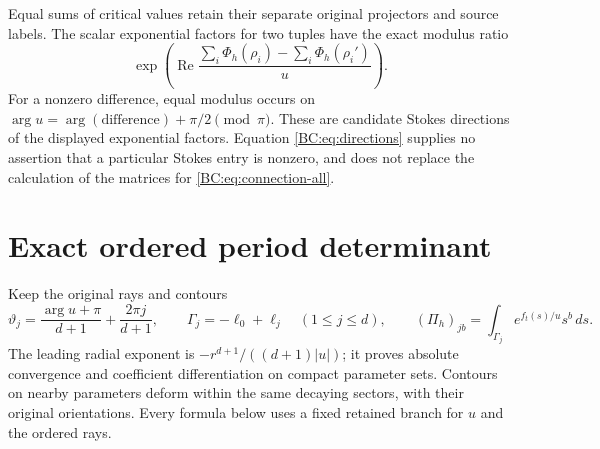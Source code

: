 \documentclass[11pt,a4paper]{article}
\begin{document}
Equal sums of critical values retain their separate original projectors
and source labels.  The scalar exponential factors for two tuples have
the exact modulus ratio
\begin{equation}
 \exp\!\left(\operatorname{Re}
      \frac{\sum_i\Phi_h(\rho_i)-\sum_i\Phi_h(\rho_i')}{u}\right).
 \label{BC:eq:directions}
\end{equation}
For a nonzero difference, equal modulus occurs on
$\arg u=\arg(\text{difference})+\pi/2\pmod\pi$.
These are candidate Stokes directions of the displayed exponential
factors.  Equation \eqref{BC:eq:directions} supplies no assertion that a
particular Stokes entry is nonzero, and does not replace the calculation
of the matrices for \eqref{BC:eq:connection-all}.

\section{Exact ordered period determinant}

Keep the original rays and contours
\begin{equation}
 \vartheta_j=\frac{\arg u+\pi}{d+1}+\frac{2\pi j}{d+1},
 \qquad \Gamma_j=-\ell_0+\ell_j\quad(1\le j\le d),
 \qquad
 (\Pi_h)_{jb}=\int_{\Gamma_j}e^{f_t(s)/u}s^b\,ds.
 \label{BC:eq:period}
\end{equation}
The leading radial exponent is
$-r^{d+1}/((d+1)|u|)$; it proves absolute convergence and
coefficient differentiation on compact parameter sets.  Contours on
nearby parameters deform within the same decaying sectors, with their
original orientations.  Every formula below uses a fixed retained
branch for $u$ and the ordered rays.
\end{document}
